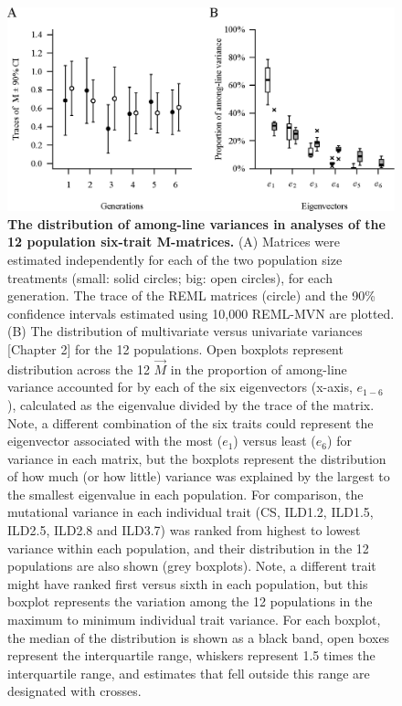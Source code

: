 \begin{figure}[htp]
\includegraphics[width=1\textwidth]{Chp3_Multi/M_traceNeigs.eps}
\vspace*{-0.4cm}
\caption[The distribution of among-line variances in analyses of the 12 population six-trait \textbf{M}-matrices.]{\textbf{The distribution of among-line variances in analyses of the 12 population six-trait M-matrices.} (A) Matrices were estimated independently for each of the two population size treatments (small: solid circles; big: open circles), for each generation. The trace of the REML matrices (circle) and the 90\% confidence intervals estimated using 10,000 REML-MVN are plotted. (B) The distribution of multivariate versus univariate variances [Chapter 2] for the 12 populations. Open boxplots represent distribution across the 12 $\vec{M}$ in the proportion of among-line variance accounted for by each of the six eigenvectors (x-axis, $e_{1-6}$ ), calculated as the eigenvalue divided by the trace of the matrix. Note, a different combination of the six traits could represent the eigenvector associated with the most ($e_1$) versus least ($e_6$) for variance in each matrix, but the boxplots represent the distribution of how much (or how little) variance was explained by the largest to the smallest eigenvalue in each population. For comparison, the mutational variance in each individual trait (CS, ILD1.2, ILD1.5, ILD2.5, ILD2.8 and ILD3.7) was ranked from highest to lowest variance within each population, and their distribution in the 12 populations are also shown (grey boxplots). Note, a different trait might have ranked first versus sixth in each population, but this boxplot represents the variation among the 12 populations in the maximum to minimum individual trait variance. For each boxplot, the median of the distribution is shown as a black band, open boxes represent the interquartile range, whiskers represent 1.5 times the interquartile range, and estimates that fell outside this range are designated with crosses.}
\label{fig:multi_specM}
\end{figure}
\FloatBarrier

